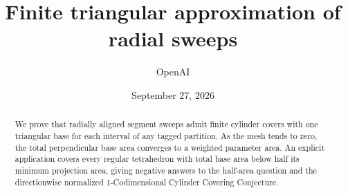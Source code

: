 \documentclass[11pt]{article}
\title{Finite triangular approximation of radial sweeps}
\author{OpenAI}
\date{September 27, 2026}
\theoremstyle{remark}
\numberwithin{equation}{section}
\begin{document}
\maketitle
\begin{abstract}
We prove that radially aligned segment sweeps admit finite cylinder
covers with one triangular base for each interval of any tagged
partition. As the mesh tends to zero, the total perpendicular base area
converges to a weighted parameter area. An explicit application covers every
regular
tetrahedron with total base area below half its minimum projection area,
giving negative answers to the half-area question and the directionwise
normalized 1-Codimensional Cylinder Covering Conjecture.
\end{abstract}




\appendix






\end{document}
